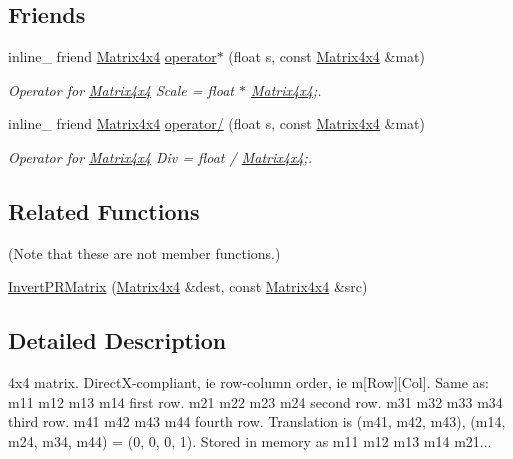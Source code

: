 \subsection*{Friends}
\begin{DoxyCompactItemize}
\item 
inline\+\_\+ friend \hyperlink{classMatrix4x4}{Matrix4x4} \hyperlink{classMatrix4x4_ab3955edca55444de0746eb97b6c7e147}{operator$\ast$} (float s, const \hyperlink{classMatrix4x4}{Matrix4x4} \&mat)\hypertarget{classMatrix4x4_ab3955edca55444de0746eb97b6c7e147}{}\label{classMatrix4x4_ab3955edca55444de0746eb97b6c7e147}

\begin{DoxyCompactList}\small\item\em Operator for \hyperlink{classMatrix4x4}{Matrix4x4} Scale = float $\ast$ \hyperlink{classMatrix4x4}{Matrix4x4};. \end{DoxyCompactList}\item 
inline\+\_\+ friend \hyperlink{classMatrix4x4}{Matrix4x4} \hyperlink{classMatrix4x4_a07714d6be5eeb50d185286661ee092e0}{operator/} (float s, const \hyperlink{classMatrix4x4}{Matrix4x4} \&mat)\hypertarget{classMatrix4x4_a07714d6be5eeb50d185286661ee092e0}{}\label{classMatrix4x4_a07714d6be5eeb50d185286661ee092e0}

\begin{DoxyCompactList}\small\item\em Operator for \hyperlink{classMatrix4x4}{Matrix4x4} Div = float / \hyperlink{classMatrix4x4}{Matrix4x4};. \end{DoxyCompactList}\end{DoxyCompactItemize}
\subsection*{Related Functions}
(Note that these are not member functions.) \begin{DoxyCompactItemize}
\item 
\hyperlink{classMatrix4x4_a48b3547948dc1927b8df321aa64f5516}{Invert\+P\+R\+Matrix} (\hyperlink{classMatrix4x4}{Matrix4x4} \&dest, const \hyperlink{classMatrix4x4}{Matrix4x4} \&src)
\end{DoxyCompactItemize}


\subsection{Detailed Description}
4x4 matrix. Direct\+X-\/compliant, ie row-\/column order, ie m\mbox{[}Row\mbox{]}\mbox{[}Col\mbox{]}. Same as\+: m11 m12 m13 m14 first row. m21 m22 m23 m24 second row. m31 m32 m33 m34 third row. m41 m42 m43 m44 fourth row. Translation is (m41, m42, m43), (m14, m24, m34, m44) = (0, 0, 0, 1). Stored in memory as m11 m12 m13 m14 m21...

